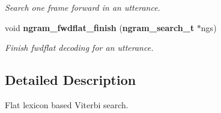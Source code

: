 \begin{DoxyCompactItemize}
\begin{DoxyCompactList}\small\item\em Search one frame forward in an utterance. \end{DoxyCompactList}\item 
void {\bf ngram\+\_\+fwdflat\+\_\+finish} ({\bf ngram\+\_\+search\+\_\+t} $\ast$ngs)\label{ngram__search__fwdflat_8h_ac855cf540ac4acdfa320629720ded6fe}

\begin{DoxyCompactList}\small\item\em Finish fwdflat decoding for an utterance. \end{DoxyCompactList}\end{DoxyCompactItemize}


\subsection{Detailed Description}
Flat lexicon based Viterbi search. 

